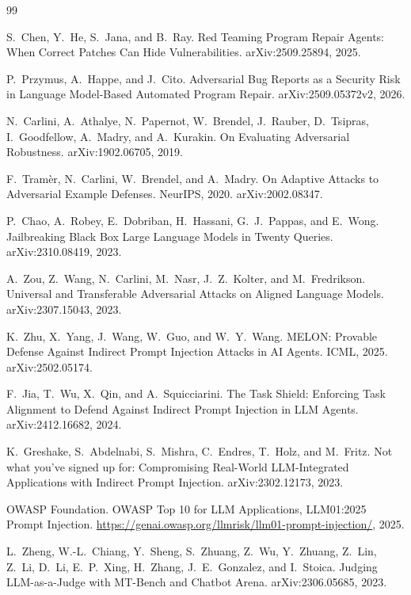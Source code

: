 \documentclass{article}
\begin{document}
\begin{thebibliography}{99}

 S.~Chen, Y.~He, S.~Jana, and B.~Ray.
Red Teaming Program Repair Agents: When Correct Patches Can Hide Vulnerabilities.
arXiv:2509.25894, 2025.

 P.~Przymus, A.~Happe, and J.~Cito.
Adversarial Bug Reports as a Security Risk in Language Model-Based Automated Program Repair.
arXiv:2509.05372v2, 2026.

 N.~Carlini, A.~Athalye, N.~Papernot, W.~Brendel, J.~Rauber, D.~Tsipras, I.~Goodfellow, A.~Madry, and A.~Kurakin.
On Evaluating Adversarial Robustness.
arXiv:1902.06705, 2019.

 F.~Tram\`er, N.~Carlini, W.~Brendel, and A.~Madry.
On Adaptive Attacks to Adversarial Example Defenses.
NeurIPS, 2020. arXiv:2002.08347.

 P.~Chao, A.~Robey, E.~Dobriban, H.~Hassani, G.~J.~Pappas, and E.~Wong.
Jailbreaking Black Box Large Language Models in Twenty Queries.
arXiv:2310.08419, 2023.

 A.~Zou, Z.~Wang, N.~Carlini, M.~Nasr, J.~Z.~Kolter, and M.~Fredrikson.
Universal and Transferable Adversarial Attacks on Aligned Language Models.
arXiv:2307.15043, 2023.

 K.~Zhu, X.~Yang, J.~Wang, W.~Guo, and W.~Y.~Wang.
MELON: Provable Defense Against Indirect Prompt Injection Attacks in AI Agents.
ICML, 2025. arXiv:2502.05174.

 F.~Jia, T.~Wu, X.~Qin, and A.~Squicciarini.
The Task Shield: Enforcing Task Alignment to Defend Against Indirect Prompt Injection in LLM Agents.
arXiv:2412.16682, 2024.

 K.~Greshake, S.~Abdelnabi, S.~Mishra, C.~Endres, T.~Holz, and M.~Fritz.
Not what you've signed up for: Compromising Real-World LLM-Integrated Applications with Indirect Prompt Injection.
arXiv:2302.12173, 2023.

 OWASP Foundation.
OWASP Top 10 for LLM Applications, LLM01:2025 Prompt Injection.
\url{https://genai.owasp.org/llmrisk/llm01-prompt-injection/}, 2025.

 L.~Zheng, W.-L.~Chiang, Y.~Sheng, S.~Zhuang, Z.~Wu, Y.~Zhuang, Z.~Lin, Z.~Li, D.~Li, E.~P.~Xing, H.~Zhang, J.~E.~Gonzalez, and I.~Stoica.
Judging LLM-as-a-Judge with MT-Bench and Chatbot Arena.
arXiv:2306.05685, 2023.


\end{thebibliography}
\end{document}
